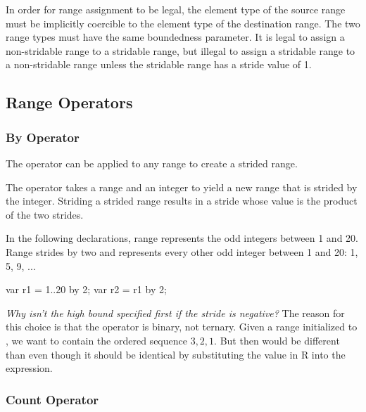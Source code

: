 In order for range assignment to be legal, the element type of the
source range must be implicitly coercible to the element type of the
destination range.  The two range types must have the same boundedness
parameter.  It is legal to assign a non-stridable range to a stridable
range, but illegal to assign a stridable range to a non-stridable
range unless the stridable range has a stride value of 1.


\subsection{Range Operators}
\label{Range_Operators}

\subsubsection{By Operator}
\label{Strided_Ranges}

The  operator can be applied to any range to create a strided
range.

The  operator takes a range and an integer to yield a new range that
is strided by the integer.  Striding a strided range results in a
stride whose value is the product of the two strides.

\begin{example}
In the following declarations, range  represents the odd integers
between 1 and 20. Range  strides  by two and represents
every other odd integer between 1 and 20: 1, 5, 9, ...
\begin{chapel}
var r1 = 1..20 by 2;
var r2 = r1 by 2;
\end{chapel}
\end{example}

\begin{rationale}
{\it Why isn't the high bound specified first if the stride is
negative?}  The reason for this choice is that the  operator
is binary, not ternary.  Given a range  initialized
to , we want  to contain the ordered sequence
$3,2,1$.  But then  would be different than  even though it should be identical by substituting the value in
R into the expression.
\end{rationale}

\subsubsection{Count Operator}
\label{Count_Operator}

